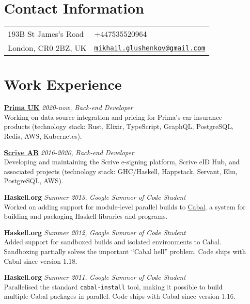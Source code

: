 \documentclass[margin,line]{res}
\begin{document}

\begin{resume}
\section{\sc Contact Information}
\vspace{.05in}
\begin{tabular}{@{}p{2in}p{4in}}
193B St James's Road&
+447535520964\\
London, CR0 2BZ, UK&
\href{mailto:mikhail.glushenkov@gmail.com}
{\texttt{mikhail.glushenkov@gmail.com}}\\
\end{tabular}

\section{\sc Work Experience}

{\bf \href{http://helloprima.co.uk}{Prima UK}} \hfill {\it 2020-now, Back-end Developer}\\
Working on data source integration and pricing for Prima's car insurance products (technology stack:
Rust, Elixir, TypeScript, GraphQL, PostgreSQL, Redis, AWS, Kubernetes).

{\bf \href{http://scrive.com}{Scrive AB}} \hfill {\it 2016-2020, Back-end Developer}\\
Developing and maintaining the Scrive e-signing platform, Scrive eID
Hub, and associated projects (technology stack: GHC/Haskell,
Happstack, Servant, Elm, PostgreSQL, AWS).

{\bf Haskell.org} \hfill {\it Summer 2013, Google Summer of Code Student}\\
Worked on adding support for module-level parallel builds to
\href{http://haskell.org/cabal}{Cabal}, a system for building and
packaging Haskell libraries and programs.

{\bf Haskell.org} \hfill {\it Summer 2012, Google Summer of Code Student}\\
Added support for sandboxed builds and isolated environments to
Cabal. Sandboxing partially solves the important ``Cabal hell'' problem. Code
ships with Cabal since version 1.18.

{\bf Haskell.org} \hfill {\it Summer 2011, Google Summer of Code Student}\\
Parallelised the standard \texttt{cabal-install} tool, making it possible to
build multiple Cabal packages in parallel. Code ships with Cabal since version
1.16.


\end{resume}
\end{document}
